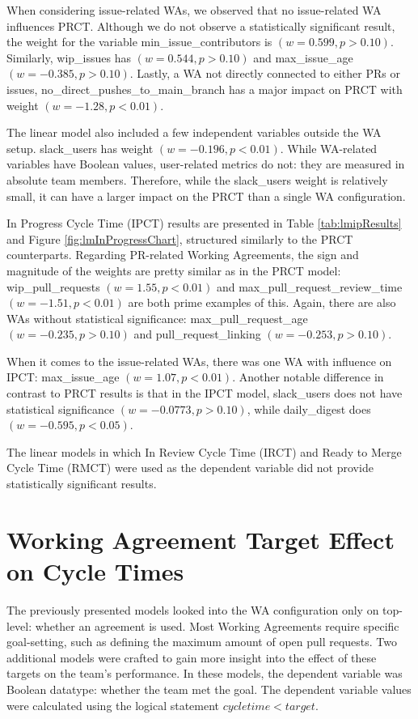 When considering issue-related WAs, we observed that no issue-related WA influences PRCT. Although we do not observe a statistically significant result, the weight for the variable min\_issue\_contributors is $(w=0.599,p>0.10)$. Similarly, wip\_issues has $(w=0.544,p>0.10)$ and max\_issue\_age $(w=-0.385,p>0.10)$. Lastly, a WA not directly connected to either PRs or issues, no\_direct\_pushes\_to\_main\_branch has a major impact on PRCT with weight $(w=-1.28,p<0.01)$.

The linear model also included a few independent variables outside the WA setup. slack\_users has weight $(w=-0.196,p<0.01)$. While WA-related variables have Boolean values, user-related metrics do not: they are measured in absolute team members. Therefore, while the slack\_users weight is relatively small, it can have a larger impact on the PRCT than a single WA configuration.

In Progress Cycle Time (IPCT) results are presented in Table \ref{tab:lmipResults} and Figure \ref{fig:lmInProgressChart}, structured similarly to the PRCT counterparts. Regarding PR-related Working Agreements, the sign and magnitude of the weights are pretty similar as in the PRCT model: wip\_pull\_requests $(w=1.55, p<0.01)$ and max\_pull\_request\_review\_time $(w=-1.51, p<0.01)$ are both prime examples of this. Again, there are also WAs without statistical significance: max\_pull\_request\_age $(w=-0.235, p>0.10)$ and pull\_request\_linking $(w=-0.253, p>0.10)$. 



When it comes to the issue-related WAs, there was one WA with influence on IPCT: max\_issue\_age $(w=1.07, p<0.01)$. Another notable difference in contrast to PRCT results is that in the IPCT model, slack\_users does not have statistical significance $(w=-0.0773, p>0.10)$, while daily\_digest does $(w=-0.595, p<0.05)$.



The linear models in which In Review Cycle Time (IRCT) and Ready to Merge Cycle Time (RMCT) were used as the dependent variable did not provide statistically significant results.

\section{Working Agreement Target Effect on Cycle Times}

The previously presented models looked into the WA configuration only on top-level: whether an agreement is used. Most Working Agreements require specific goal-setting, such as defining the maximum amount of open pull requests. Two additional models were crafted to gain more insight into the effect of these targets on the team's performance. In these models, the dependent variable was Boolean datatype: whether the team met the goal. The dependent variable values were calculated using the logical statement $cycletime < target$. 

